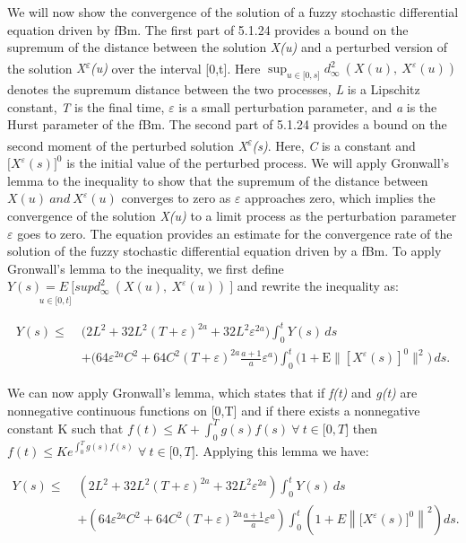 \documentclass[12pt,a4paper]{report}
\numberwithin{equation}{section}
\begin{document}
We will now show the convergence of the solution of a fuzzy stochastic
differential equation driven by fBm. The first part of 5.1.24 provides a
bound on the supremum of the distance between the solution \emph{X(u)}
and a perturbed version of the solution \emph{X\textsuperscript{$\varepsilon$}(u)}
over the interval {[}0,t{]}. Here
\(\sup_{u \in \lbrack 0,s\rbrack}{d_{\infty}^{2}\ \left( X(u),\ X^{\varepsilon}(u) \right)}\)
denotes the supremum distance between the two processes, \emph{L} is a
Lipschitz constant, \emph{T} is the final time, $\varepsilon$ is a small
perturbation parameter, and \emph{a} is the Hurst parameter of the fBm.
The second part of 5.1.24 provides a bound on the second moment of the
perturbed solution \emph{X\textsuperscript{$\varepsilon$}(s)}. Here, \emph{C} is a
constant and \(\lbrack X^{\varepsilon}(s)\rbrack^{0}\) is the initial
value of the perturbed process. We will apply Gronwall's lemma to the
inequality to show that the supremum of the distance between
\(X(u)\ and\ X^{\varepsilon}(u)\) converges to zero as \emph{$\varepsilon$}
approaches zero, which implies the convergence of the solution
\emph{X(u)} to a limit process as the perturbation parameter \emph{$\varepsilon$}
goes to zero. The equation provides an estimate for the convergence rate
of the solution of the fuzzy stochastic differential equation driven by
a fBm. To apply Gronwall's lemma to the inequality, we first define
\(\underset{\ \ \ \ \ u \in \lbrack 0,t\rbrack}{Y(s) = E\ \lbrack sup}{d_{\infty}^{2}\ \left( X(u),\ X^{\varepsilon}(u) \right)\ }\rbrack\)
and rewrite the inequality as:

\[
\begin{aligned}
Y(s) \le\;& \bigl(2L^{2} + 32L^{2}(T + \varepsilon)^{2a} + 32L^{2}\varepsilon^{2a}\bigr)\int_{0}^{t} Y(s)\,ds \\
&+ \bigl(64\varepsilon^{2a}C^{2} + 64C^{2}(T + \varepsilon)^{2a}\tfrac{a + 1}{a}\varepsilon^{a}\bigr)
\int_{0}^{t}\bigl(1 + \mathrm{E}\|[X^{\varepsilon}(s)]^{0}\|^{2}\bigr)\,ds .
\end{aligned}
\]


We can now apply Gronwall's lemma, which states that if \emph{f(t)} and
\emph{g(t)} are nonnegative continuous functions on {[}0,T{]} and if
there exists a nonnegative constant K such that
\(f(t) \leq K + \int_{0}^{T}{g(s)f(s)\ \forall\ t \in \lbrack 0,T\rbrack}\)
then
\(f(t) \leq Ke^{\int_{0}^{T}{g(s)f(s)\ \ }}\forall\ t \in \lbrack 0,T\rbrack\).
Applying this lemma we have:

\[
\begin{aligned}
Y(s) \le\;& \left( 2L^{2} + 32L^{2}(T + \varepsilon)^{2a} + 32L^{2}\varepsilon^{2a} \right)
\int_{0}^{t} Y(s)\,ds \\
&+ \left( 64\varepsilon^{2a}C^{2} + 64C^{2}(T + \varepsilon)^{2a}\frac{a + 1}{a}\varepsilon^{a} \right)
\int_{0}^{t} \left( 1 + E\left\| \bigl[X^{\varepsilon}(s)\bigr]^{0} \right\|^{2} \right) ds .
\end{aligned}
\]
\end{document}
